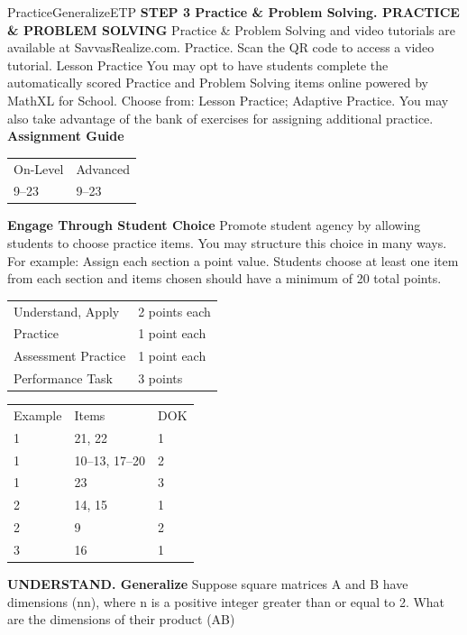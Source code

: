 \documentclass{article}
\newenvironment{item-analysis}{}{}      %
\newenvironment{practice}[2]{}{}        %
\newenvironment{te-addendum}[2]{}{}     %
\newcommand{\answer}[1]{}               %
\begin{document}
\begin{te-addendum}{Practice}{GeneralizeETP}
\textbf{STEP 3 Practice \& Problem Solving. PRACTICE \& PROBLEM SOLVING}
Practice \& Problem Solving and video tutorials are available at SavvasRealize.com. Practice. Scan the QR code to access a video tutorial.
Lesson Practice You may opt to have students complete the automatically scored Practice and Problem Solving items online powered by MathXL for School.
Choose from: Lesson Practice; Adaptive Practice.
You may also take advantage of the bank of exercises for assigning additional practice.
\textbf{Assignment Guide}
\begin{tabular}{ll}
On-Level & Advanced \\
9--23 & 9--23 \\
\end{tabular}
\textbf{Engage Through Student Choice}
Promote student agency by allowing students to choose practice items. You may structure this choice in many ways. For example:
Assign each section a point value. Students choose at least one item from each section and items chosen should have a minimum of 20 total points.
\begin{tabular}{ll}
Understand, Apply & 2 points each \\
Practice & 1 point each \\
Assessment Practice & 1 point each \\
Performance Task & 3 points \\
\end{tabular}
\end{te-addendum}
\begin{item-analysis}
\begin{tabular}{lll}
Example & Items & DOK \\
1 & 21, 22 & 1 \\
1 & 10--13, 17--20 & 2 \\
1 & 23 & 3 \\
2 & 14, 15 & 1 \\
2 & 9 & 2 \\
3 & 16 & 1 \\
\end{tabular}
\end{item-analysis}
\begin{practice}{9}{2}
\textbf{UNDERSTAND. Generalize} Suppose square matrices A and B have dimensions (n\times n), where n is a positive integer greater than or equal to 2. What are the dimensions of their product (A\times B)
\answer{The product also has dimensions (n\times n).}
\end{practice}
\end{document}
